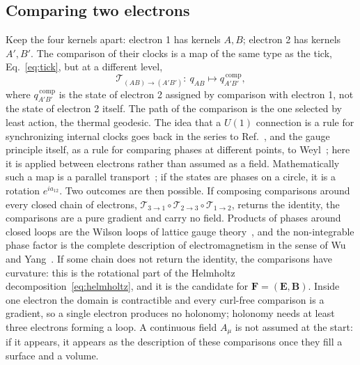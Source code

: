 \documentclass[%
 reprint, amsmath,amssymb, aps, prb, ]{revtex4-2}
\numberwithin{equation}{section}
\newcommand{\FF}{\mathbf{F}}
\newcommand{\Tmap}{\mathcal{T}}
\begin{document}
\subsection{Comparing two electrons}

Keep the four kernels apart: electron 1 has kernels $A,B$; electron 2 has kernels $A',B'$. The comparison of their clocks is a map of the same type as the tick, Eq.~\eqref{eq:tick}, but at a different level,
\begin{equation}
\Tmap_{(AB)\to(A'B')}:\ q_{AB}\longmapsto q_{A'B'}^{\,\mathrm{comp}},
\label{eq:compare}
\end{equation}
where $q_{A'B'}^{\,\mathrm{comp}}$ is the state of electron 2 assigned by comparison with electron 1, not the state of electron 2 itself. The path of the comparison is the one selected by least action, the thermal geodesic. The idea that a $U(1)$ connection is a rule for synchronizing internal clocks goes back in the series to Ref.~\cite{ref:p17}, and the gauge principle itself, as a rule for comparing phases at different points, to Weyl~\cite{ref:weyl29}; here it is applied between electrons rather than assumed as a field. Mathematically such a map is a parallel transport~\cite{ref:nakahara}; if the states are phases on a circle, it is a rotation $e^{ia_{12}}$. Two outcomes are then possible. If composing comparisons around every closed chain of electrons, $\Tmap_{3\to1}\circ\Tmap_{2\to3}\circ\Tmap_{1\to2}$, returns the identity, the comparisons are a pure gradient and carry no field. Products of phases around closed loops are the Wilson loops of lattice gauge theory~\cite{ref:wilson74}, and the non-integrable phase factor is the complete description of electromagnetism in the sense of Wu and Yang~\cite{ref:wuyang}. If some chain does not return the identity, the comparisons have curvature: this is the rotational part of the Helmholtz decomposition~\eqref{eq:helmholtz}, and it is the candidate for $\FF=(\mathbf{E},\mathbf{B})$. Inside one electron the domain is contractible and every curl-free comparison is a gradient, so a single electron produces no holonomy; holonomy needs at least three electrons forming a loop. A continuous field $A_\mu$ is not assumed at the start: if it appears, it appears as the description of these comparisons once they fill a surface and a volume.
\end{document}
